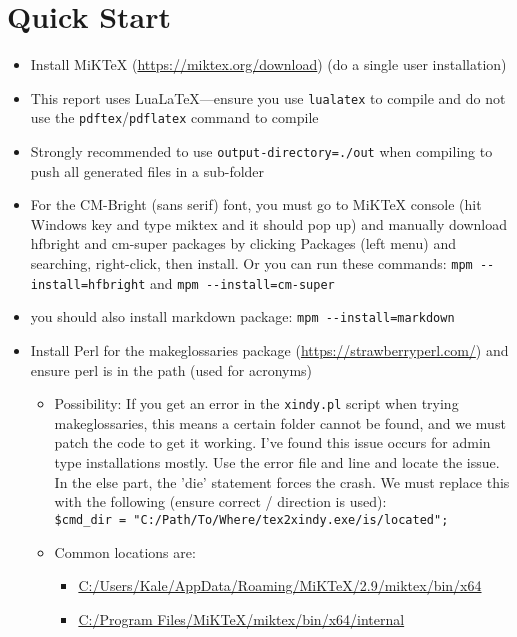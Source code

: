 \documentclass{corpboreport}
\begin{document}
\section{Quick Start}
\begin{itemize}
    \item Install MiKTeX (\url{https://miktex.org/download}) (do a single user installation)
    \item This report uses LuaLaTeX---ensure you use \texttt{lualatex} to compile and do not use the \texttt{pdftex}/\texttt{pdflatex} command to compile
    \item Strongly recommended to use \texttt{output-directory=./out} when compiling to push all generated files in a sub-folder
    \item For the CM-Bright (sans serif) font, you must go to MiKTeX console (hit Windows key and type miktex and it should pop up) and manually download hfbright and cm-super packages by clicking Packages (left menu) and searching, right-click, then install. Or you can run these commands: \texttt{mpm -\/-install=hfbright} and \texttt{mpm -\/-install=cm-super}
    \item you should also install markdown package: \texttt{mpm -\/-install=markdown}
    \item Install Perl for the makeglossaries package (\url{https://strawberryperl.com/}) and ensure perl is in the path (used for acronyms)
    \begin{itemize}
        \item Possibility: If you get an error in the \texttt{xindy.pl} script when trying makeglossaries, this means a certain folder cannot be found,
                and we must patch the code to get it working. I've found this issue occurs for admin type installations mostly. Use the error file and line and locate the issue. In the else part, the 'die' statement forces the crash.
                We must replace this with the following (ensure correct / direction is used):\\
                \texttt{\$cmd\_dir = "C:/Path/To/Where/tex2xindy.exe/is/located";}
        \item Common locations are:
        \begin{itemize}
            \item \url{C:/Users/Kale/AppData/Roaming/MiKTeX/2.9/miktex/bin/x64}
            \item \url{C:/Program Files/MiKTeX/miktex/bin/x64/internal}
        \end{itemize}
    \end{itemize}
\end{itemize}
\end{document}

